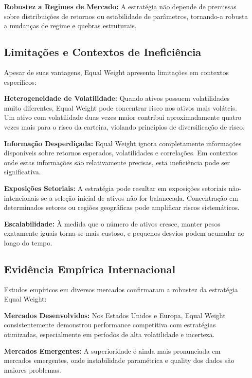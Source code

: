 \textbf{Robustez a Regimes de Mercado:} A estratégia não depende de premissas sobre distribuições de retornos ou estabilidade de parâmetros, tornando-a robusta a mudanças de regime e quebras estruturais.

\subsection{Limitações e Contextos de Ineficiência}

Apesar de suas vantagens, Equal Weight apresenta limitações em contextos específicos:

\textbf{Heterogeneidade de Volatilidade:} Quando ativos possuem volatilidades muito diferentes, Equal Weight pode concentrar risco nos ativos mais voláteis. Um ativo com volatilidade duas vezes maior contribui aproximadamente quatro vezes mais para o risco da carteira, violando princípios de diversificação de risco.

\textbf{Informação Desperdiçada:} Equal Weight ignora completamente informações disponíveis sobre retornos esperados, volatilidades e correlações. Em contextos onde estas informações são relativamente precisas, esta ineficiência pode ser significativa.

\textbf{Exposições Setoriais:} A estratégia pode resultar em exposições setoriais não-intencionais se a seleção inicial de ativos não for balanceada. Concentração em determinados setores ou regiões geográficas pode amplificar riscos sistemáticos.

\textbf{Escalabilidade:} À medida que o número de ativos cresce, manter pesos exatamente iguais torna-se mais custoso, e pequenos desvios podem acumular ao longo do tempo.

\subsection{Evidência Empírica Internacional}

Estudos empíricos em diversos mercados confirmaram a robustez da estratégia Equal Weight:

\textbf{Mercados Desenvolvidos:} Nos Estados Unidos e Europa, Equal Weight consistentemente demonstrou performance competitiva com estratégias otimizadas, especialmente em períodos de alta volatilidade e incerteza.

\textbf{Mercados Emergentes:} A superioridade é ainda mais pronunciada em mercados emergentes, onde instabilidade paramétrica e quality dos dados são maiores problemas.

